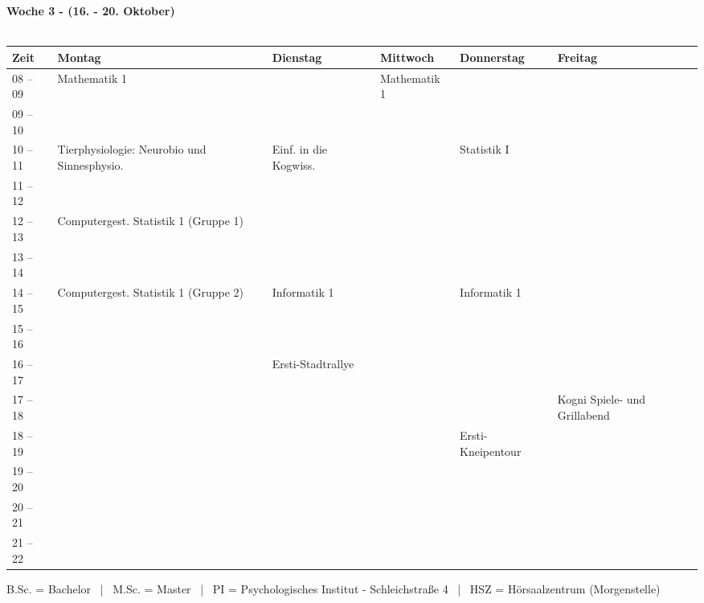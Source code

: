 \textbf{Woche 3 - (16. - 20. Oktober)}\\
\\
\begin{tabular}{|l|p{}|p{}|p{}|p{}|p{}|} \hline
	Zeit & Montag & Dienstag & Mittwoch & Donnerstag & Freitag \\ 
	\hline \hline
 08 -- 09 & \footnotesize{Mathematik 1} & & \footnotesize{Mathematik 1} & & \\ \cline{1-1}
 09 -- 10 & & & & & \\ \cline{1-5}
 10 -- 11 & \footnotesize{Tierphysiologie: Neurobio und Sinnesphysio.} & \footnotesize{Einf. in die Kogwiss.} & & \footnotesize{Statistik I} & \\ \cline{1-1} 
 11 -- 12 &  &  & &  & \\ \hline
 12 -- 13 & \footnotesize{Computergest. Statistik 1 (Gruppe 1)}& & & & \\ \cline{1-1}
 13 -- 14 & & & & & \\ \hline
 14 -- 15 & \footnotesize{Computergest. Statistik 1 (Gruppe 2)} & \footnotesize{Informatik 1} & & \footnotesize{Informatik 1} & \\  \cline {1-1}
 15 -- 16 & &  & & & \\ \hline
 16 -- 17 & & \scriptsize{Ersti-Stadtrallye} \cellcolor{lightlightgray} & & & \\ \cline{1-1}
 17 -- 18 & & \cellcolor{lightlightgray}& & & \scriptsize{Kogni Spiele- und Grillabend} \cellcolor{lightlightgray}\\ \cline{1-1} \cline{4-5}
 18 -- 19 & & \cellcolor{lightlightgray} & & \scriptsize{Ersti-Kneipentour} \cellcolor{lightlightgray}&  \cellcolor{lightlightgray}\\ \cline{1-1}
 19 -- 20 & & \cellcolor{lightlightgray} & & \cellcolor{lightlightgray} & \cellcolor{lightlightgray}\\ \cline{1-1}
 20 -- 21 & & & &  \cellcolor{lightlightgray}& \cellcolor{lightlightgray}\\ \cline{1-1}
 21 -- 22 & & & &  \cellcolor{lightlightgray}& \cellcolor{lightlightgray}\\ \hline
\end{tabular}

\scriptsize{B.Sc. = Bachelor ~|~ M.Sc. = Master ~|~ PI = Psychologisches Institut - Schleichstraße 4 ~|~ HSZ = Hörsaalzentrum (Morgenstelle)}


